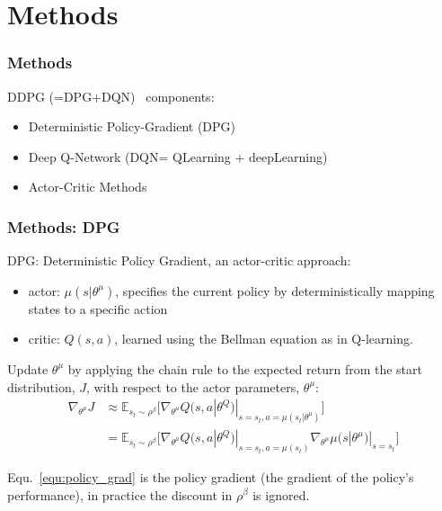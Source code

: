 \section{Methods}

\begin{frame}
\frametitle{Methods}
DDPG (=DPG+DQN)~\cite{Lillicrap2015} components:
\begin{itemize}
  \item Deterministic Policy-Gradient (DPG) \cite{Silver2014}
  \item Deep Q-Network (DQN= QLearning + deepLearning) \cite{Mnih2013}
  \item Actor-Critic Methods \cite{Sutton1998}
\end{itemize}

\end{frame}

\begin{frame}
\frametitle{Methods: DPG \cite{Silver2014}}

DPG: Deterministic Policy Gradient, an actor-critic approach:
\begin{itemize}
  \item actor: $\mu (s|\theta^{\mu})$,
  specifies the current policy by deterministically mapping states to a specific action
  \item critic: $Q(s, a)$,
  learned using the Bellman equation as in Q-learning.
\end{itemize}

Update $\theta^{\mu}$ by applying the chain rule to the expected return from
the start distribution, $J$, with respect to the actor parameters, $\theta^{\mu}$:
\begin{equation} \label{equ:policy_grad}
\begin{split}
\nabla_{\theta^{\mu}} J &  \approx \mathbb{E}_{s_t \sim \rho^{\beta}} \Big[ \nabla_{\theta^{\mu}} Q(s,a|\theta^Q) |_{s = s_t, a = \mu(s_t|\theta^{\mu})} \Big] \\
  & = \mathbb{E}_{s_t \sim \rho^{\beta}} \Big[ \nabla_{\theta^{\mu}} Q(s,a|\theta^Q) |_{s = s_t, a = \mu(s_t)} \nabla_{\theta^{\mu}} \mu(s|\theta^{\mu})|_{s = s_t} \Big]
\end{split}
\end{equation}

Equ.~\ref{equ:policy_grad} is the policy gradient (the gradient of the policy's performance),
in practice the discount in $\rho^{\beta}$ is ignored.
\end{frame}

